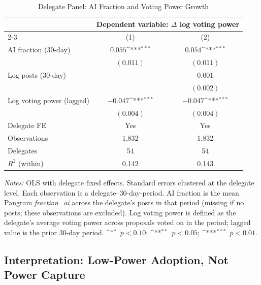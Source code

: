 \documentclass[12pt]{article}
\newcommand{\sym}[1]{\ifmmode^{#1}\else\(^{#1}\)\fi}
\begin{document}
\begin{table}[H]
\centering
\caption{Delegate Panel: AI Fraction and Voting Power Growth}
\label{tab:delegate_panel}
\begin{singlespace}
\begin{tabular}{lcc}
\toprule
 & \multicolumn{2}{c}{Dependent variable: $\Delta$ log voting power} \\
\cmidrule(lr){2-3}
 & \multicolumn{1}{c}{(1)} & \multicolumn{1}{c}{(2)} \\
\midrule
AI fraction (30-day)        & $0.055$\sym{***} & $0.054$\sym{***} \\
                            & $(0.011)$        & $(0.011)$        \\
Log posts (30-day)          &                  & $0.001$          \\
                            &                  & $(0.002)$        \\
Log voting power (lagged)   & $-0.047$\sym{***} & $-0.047$\sym{***} \\
                            & $(0.004)$        & $(0.004)$        \\
\midrule
Delegate FE                 & Yes              & Yes              \\
Observations                & 1,832            & 1,832            \\
Delegates                   & 54               & 54               \\
$R^2$ (within)              & 0.142            & 0.143            \\
\bottomrule
\end{tabular}
\begin{flushleft}
\small\textit{Notes:} OLS with delegate fixed effects. Standard errors clustered
at the delegate level. Each observation is a delegate--30-day-period. AI fraction
is the mean Pangram \textit{fraction\_ai} across the delegate's posts in that
period (missing if no posts; these observations are excluded). Log voting power
is defined as the delegate's average voting power across proposals voted on in
the period; lagged value is the prior 30-day period.
\sym{*}~$p < 0.10$; \sym{**}~$p < 0.05$; \sym{***}~$p < 0.01$.
\end{flushleft}
\end{singlespace}
\end{table}

\subsection{Interpretation: Low-Power Adoption, Not Power Capture}
\end{document}
